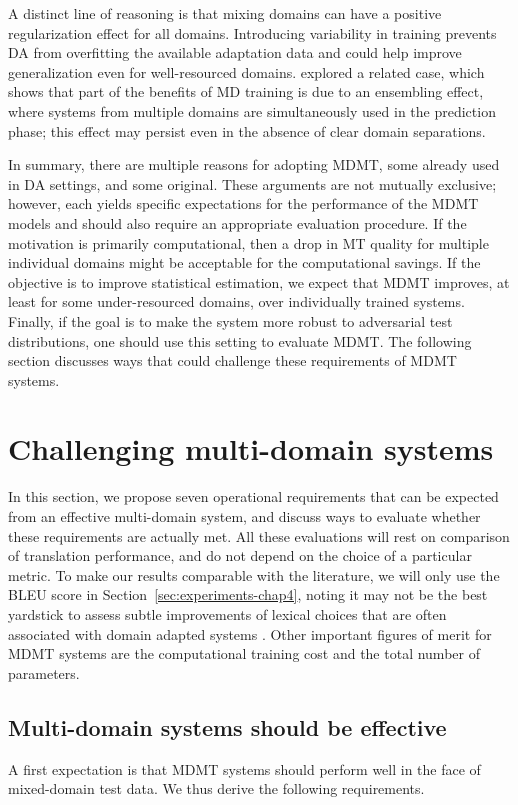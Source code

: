 A distinct line of reasoning is that mixing domains can have a positive regularization effect for all domains. Introducing variability in training prevents DA from overfitting the available adaptation data and could help improve generalization even for well-resourced domains. \citet{Joshi12multidomain} explored a related case, which shows that part of the benefits of MD training is due to an ensembling effect, where systems from multiple domains are simultaneously used in the prediction phase; this effect may persist even in the absence of clear domain separations.

In summary, there are multiple reasons for adopting MDMT, some already used in DA settings, and some original. These arguments are not mutually exclusive; however, each yields specific expectations for the performance of the MDMT models and should also require an appropriate evaluation procedure. If the motivation is primarily computational, then a drop in MT quality for multiple individual domains might be acceptable for the computational savings. If the objective is to improve statistical estimation, we expect that MDMT improves, at least for some under-resourced domains, over individually trained systems. Finally, if the goal is to make the system more robust to adversarial test distributions, one should use this setting to evaluate MDMT. The following section discusses ways that could challenge these requirements of MDMT systems. 

\section{Challenging multi-domain systems \label{sec:challenging-chap4}}
In this section, we propose seven operational requirements that can be expected from an effective multi-domain system, and discuss ways to evaluate whether these requirements are actually met. All these evaluations will rest on comparison of translation performance, and do not depend on the choice of a particular metric. To make our results comparable with the literature, we will only use the BLEU score \citep{Papineni02bleu} in Section~\ref{sec:experiments-chap4}, noting it may not be the best yardstick to assess subtle improvements of lexical choices that are often associated with domain adapted systems \citep{Irvine13measuring}. Other important figures of merit for MDMT systems are the computational training cost and the total number of parameters.

\subsection{Multi-domain systems should be effective \label{ssec:effective-chap4}}
A first expectation is that MDMT systems should perform well in the face of mixed-domain test data. We thus derive the following requirements.

